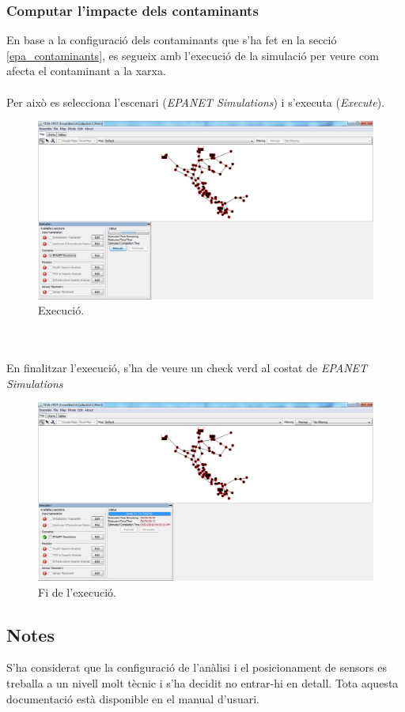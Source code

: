 \documentclass[12pt]{article}
\begin{document}
\subsubsection{Computar l'impacte dels contaminants\label{epa_computar}}
En base a la configuració dels contaminants que s'ha fet en la secció \ref{epa_contaminants}, es segueix amb l'execució de la simulació per veure com afecta el contaminant a la xarxa.
\\\\Per això es selecciona l'escenari (\textit{EPANET Simulations}) i s'executa (\textit{Execute}).
\pagebreak
\begin{figure}[h!]
	\centering
	\includegraphics[scale=.35]{imatges/teva-spot/7.png}
	\caption{Execució.}
\end{figure}
\\\\En finalitzar l'execució, s'ha de veure un check verd al costat de \textit{EPANET Simulations}
\begin{figure}[h!]
	\centering
	\includegraphics[scale=.35]{imatges/teva-spot/8.png}
	\caption{Fi de l'execució.}
\end{figure}
\clearpage
\subsection{Notes}
S'ha considerat que la configuració de l'anàlisi i el posicionament de sensors es treballa a un nivell molt tècnic i s'ha decidit no entrar-hi en detall. Tota aquesta documentació està disponible en el manual d'usuari. \cite{tevaSpotGui}
\end{document}
